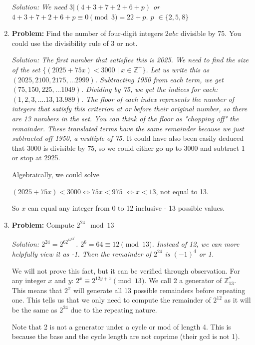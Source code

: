 \documentclass{article}
\begin{document}
\begin{enumerate}
    \textit{Solution: We need $3 | (4+3+7+2+6+p) $ or $4+3+7+2+6+p \equiv 0 \pmod{3} = 22 + p$. $p$ $\in \{2, 5, 8\}$  } 

    \item \textbf{Problem:}
    Find the number of four-digit integers \(2abc\) divisible by 75. You could use the divisibility rule of 3 or not.

    \textit{Solution: The first number that satisfies this is 2025. We need to find the size of the set $\{(2025 + 75x) < 3000 \mid x \in \mathbb{Z^+}\}$. Let us write this as $(2025, 2100, 2175, \ldots 2999)$. Subtracting 1950 from each term, we get $(75, 150, 225,\ldots 1049)$. Dividing by 75, we get the indices for each: $(1, 2, 3, .... 13, 13.989)$. The floor of each index represents the number of integers that satisfy this criterion at or before their original number, so there are 13 numbers in the set. You can think of the floor as "chopping off" the remainder. These translated terms have the same remainder because we just subtracted off 1950, a multiple of 75. }
    It could have also been easily deduced that 3000 is divisible by 75, so we could either go up to 3000 and subtract 1 or stop at 2925. 

    Algebraically, we could solve 
    
    $(2025 + 75x) < 3000 \iff 75x < 975$ $\iff x < 13$, not equal to 13. 
    
    So $x$ can equal any integer from 0 to 12 inclusive - 13 possible values.

    \item \textbf{Problem:} Compute $2^{24} \mod 13$
    
    \textit{Solution: $2^{24} = 2^62^62^62^6$. $2^6 = 64 \equiv 12 \pmod{13}$. Instead of 12, we can more helpfully view it as -1. Then the remainder of $2^{24}$ is $(-1)^4$ or 1. }
    
    We will not prove this fact, but it can be verified through observation. For any integer $x$ and $y$: $2^{x} \equiv 2^{12y+x} \pmod{13}$. We call 2 a generator of $\mathbb{Z}_{13}^*$. This means that $2^{x}$ will generate all 13 possible remainders before repeating one. This tells us that we only need to compute the remainder of $2^{12}$ as it will be the same as $2^24$ due to the repeating nature.
    
    Note that 2 is not a generator under a cycle or mod of length 4. This is because the base and the cycle length are not coprime (their gcd is not 1).




\end{enumerate}
\end{document}

